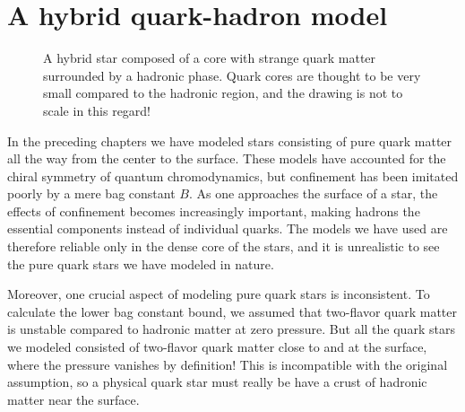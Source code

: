 \chapter{A hybrid quark-hadron model}
\label{chap:hybrid}



\begin{figure}[th!]
\centering
{}
\caption{\label{fig:hybrid:illustration}%
	A hybrid star composed of a core with strange quark matter surrounded by a hadronic phase.
	Quark cores are thought to be very small compared to the hadronic region, and the drawing is not to scale in this regard!
}
\end{figure}

In the preceding chapters we have modeled stars consisting of pure quark matter all the way from the center to the surface.
These models have accounted for the chiral symmetry of quantum chromodynamics,
but confinement has been imitated poorly by a mere bag constant $B$.
As one approaches the surface of a star,
the effects of confinement becomes increasingly important,
making hadrons the essential components instead of individual quarks.
The models we have used are therefore reliable only in the dense core of the stars,
and it is unrealistic to see the pure quark stars we have modeled in nature.

Moreover, one crucial aspect of modeling pure quark stars is inconsistent.
To calculate the lower bag constant bound, we assumed that two-flavor quark matter is unstable compared to hadronic matter at zero pressure.
But all the quark stars we modeled consisted of two-flavor quark matter close to and at the surface,
where the pressure vanishes by definition!
This is incompatible with the original assumption,
so a physical quark star must really be have a crust of hadronic matter near the surface.

